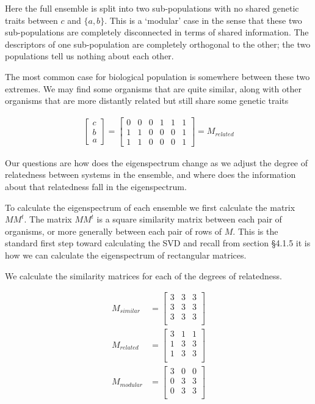 \documentclass[
  letterpaper,
  DIV=11,
  numbers=noendperiod]{scrartcl}
\begin{document}
Here the full ensemble is split into two sub-populations with no shared
genetic traits between \(c\) and \(\{a, b\}\). This is a `modular' case
in the sense that these two sub-populations are completely disconnected
in terms of shared information. The descriptors of one sub-population
are completely orthogonal to the other; the two populations tell us
nothing about each other.

The most common case for biological population is somewhere between
these two extremes. We may find some organisms that are quite similar,
along with other organisms that are more distantly related but still
share some genetic traits

\begin{align*}
\begin{bmatrix}c\\b\\a\end{bmatrix} = \begin{bmatrix}0&0&0&1&1&1\\1&1&0&0&0&1\\1&1&0&0&0&1\end{bmatrix} =  M_{related}
\end{align*}

Our questions are how does the eigenspectrum change as we adjust the
degree of relatedness between systems in the ensemble, and where does
the information about that relatedness fall in the eigenspectrum.

To calculate the eigenspectrum of each ensemble we first calculate the
matrix \(MM^t\). The matrix \(MM^t\) is a square similarity matrix
between each pair of organisms, or more generally between each pair of
rows of \(M\). This is the standard first step toward calculating the
SVD and recall from section §4.1.5 it is how we can calculate the
eigenspectrum of rectangular matrices.

We calculate the similarity matrices for each of the degrees of
relatedness.

\begin{align*}
M_{similar} &= \begin{bmatrix}3&3&3\\3&3&3\\3&3&3\\\end{bmatrix} \\
M_{related} &= \begin{bmatrix}3&1&1\\1&3&3\\1&3&3\\\end{bmatrix} \\
M_{modular} &= \begin{bmatrix}3&0&0\\0&3&3\\0&3&3\\\end{bmatrix} \\
\end{align*}
\end{document}
